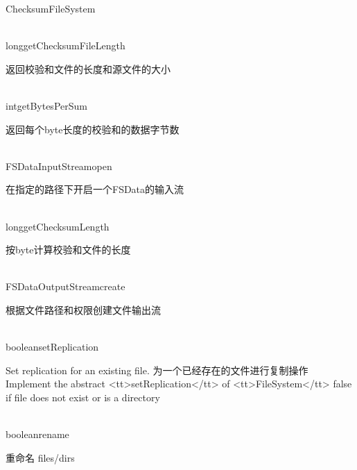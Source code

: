 \begin{XeClass}{ChecksumFileSystem}
  \begin{XeMethod}{\XePublic\\ }{long}{getChecksumFileLength}
       
 返回校验和文件的长度和源文件的大小

  \end{XeMethod}

  \begin{XeMethod}{\XePublic\\ }{int}{getBytesPerSum}
       
 返回每个byte长度的校验和的数据字节数

  \end{XeMethod}

  \begin{XeMethod}{\XePublic\\ }{FSDataInputStream}{open}
       
 在指定的路径下开启一个FSData的输入流

  \end{XeMethod}

  \begin{XeMethod}{\XePublic\\ }{long}{getChecksumLength}
       
 按byte计算校验和文件的长度

  \end{XeMethod}

  \begin{XeMethod}{\XePublic\\ }{FSDataOutputStream}{create}
       
 根据文件路径和权限创建文件输出流

  \end{XeMethod}

  \begin{XeMethod}{\XePublic\\ }{boolean}{setReplication}
       
 Set replication for an existing file.
 为一个已经存在的文件进行复制操作
 Implement the abstract <tt>setReplication</tt> of <tt>FileSystem</tt>
 false if file does not exist or is a directory

  \end{XeMethod}

  \begin{XeMethod}{\XePublic\\ }{boolean}{rename}
       
 重命名 files/dirs

  \end{XeMethod}


\end{XeClass}

